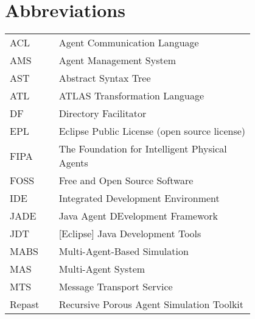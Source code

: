 \chapter*{Abbreviations}




\begin{flushleft}
\begin{tabular}{l p{0.8\linewidth}}
ACL  		& {Agent Communication Language} \\
AMS  		& {Agent Management System} \\
AST  		& {Abstract Syntax Tree} \\
ATL  		& {ATLAS Transformation Language} \\
DF  		& {Directory Facilitator} \\
EPL  		& {Eclipse Public License (open source license)} \\
FIPA  		& {The Foundation for Intelligent Physical Agents} \\
FOSS  		& {Free and Open Source Software} \\
IDE  		& {Integrated Development Environment} \\
JADE  		& {Java Agent DEvelopment Framework} \\
JDT  		& {[Eclipse] Java Development Tools} \\
MABS  		& {Multi-Agent-Based Simulation} \\
MAS  		& {Multi-Agent System} \\
MTS  		& {Message Transport Service} \\
Repast  	& {Recursive Porous Agent Simulation Toolkit} \\
\end{tabular}
\end{flushleft}

